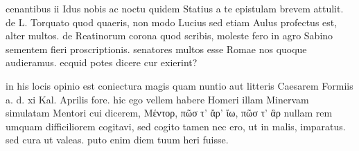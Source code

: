 


 cenantibus ii Idus nobis ac noctu quidem Statius a te epistulam brevem attulit. de L. Torquato quod quaeris, non modo Lucius sed etiam Aulus profectus est, alter multos. de Reatinorum corona quod scribis, moleste fero in agro Sabino sementem fieri proscriptionis. senatores multos esse Romae nos quoque audieramus. ecquid potes dicere cur exierint?

 in his locis opinio est coniectura magis quam nuntio aut litteris Caesarem Formiis a. d. xi Kal. Aprilis fore. hic ego vellem habere Homeri illam Minervam simulatam Mentori cui dicerem, Μέντορ, πῶσ τ' ἄρ' ἴω, πῶσ τ' ἂρ nullam rem umquam difficiliorem cogitavi, sed cogito tamen nec ero, ut in malis, imparatus. sed cura ut valeas. puto enim diem tuum heri fuisse.
